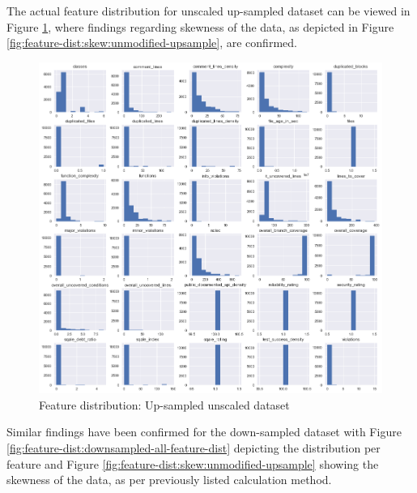 The actual feature distribution for unscaled up-sampled dataset can be viewed in Figure \ref{fig:feature-dist:upsampled-all-feature-dist}, where findings regarding skewness of the data, as depicted in Figure \ref{fig:feature-dist:skew:unmodified-upsample}, are confirmed.

\begin{figure}[!h]
    \centering
    \includegraphics[scale=0.45]{Figures/feature-dist/attrib_dist_upscaled_unmod.png}
    \caption{Feature distribution: Up-sampled unscaled dataset}
    \label{fig:feature-dist:upsampled-all-feature-dist}
\end{figure}

Similar findings have been confirmed for the down-sampled dataset with Figure \ref{fig:feature-dist:downsampled-all-feature-dist} depicting the distribution per feature and Figure \ref{fig:feature-dist:skew:unmodified-upsample} showing the skewness of the data, as per previously listed calculation method.

